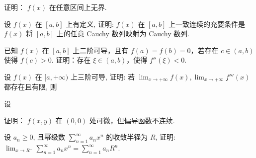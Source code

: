 证明： $f(x)$ 在任意区间上无界.\par
设 $f(x)$ 在 $[a, b]$ 上有定义, 证明: $f(x)$ 在 $[a, b]$ 上一致连续的充要条件是 $f(x)$ 将 $[a, b]$ 上的任意 Cauchy 数列映射为 Cauchy 数列.\par
已知 $f(x)$ 在 $[a, b]$ 上二阶可导，且有 $f(a) = f(b) = 0$，若存在 $c \in (a, b)$ 使得 $f(c) > 0$. 证明：存在 $\xi \in (a, b)$，使得 $f''(\xi) < 0$.\par
\par{}
设 $f(x)$ 在 $[a, +\infty)$ 上三阶可导, 证明: 若 $\lim_{x \to +\infty} f(x), \lim_{x \to +\infty} f'''(x)$ 都存在且有限, 则\par
\nopagebreak[4]
\par{}
设\par
\nopagebreak[4]
证明： $f(x,y)$ 在 $(0,0)$ 处可微，但偏导函数不连续.\par
设 $a_{n} \geq 0$, 且幂级数 $\sum_{n=1}^{\infty} a_{n} x^{n}$ 的收敛半径为 $R$, 证明: $\lim_{x \to R^{-}} \sum_{n=1}^{\infty} a_{n} x^{n} = \sum_{n=1}^{\infty} a_{n} R^{n}$.\par
